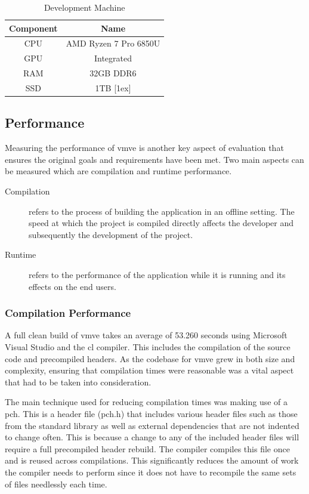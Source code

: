 \documentclass[11pt]{article}
\begin{document}
\begin{table}[H]
\centering
\begin{tabular}{|| c c ||} 
  \hline
  Component & Name \\ [0.5ex] 
  \hline\hline
  CPU & AMD Ryzen 7 Pro 6850U  \\ 
  GPU & Integrated \\
  RAM & 32GB DDR6 \\ 
  SSD & 1TB [1ex] \\
  \hline
\end{tabular}
\caption{Development Machine}
\label{fig:development_machine}
\end{table}


\subsection{Performance}
Measuring the performance of \gls*{vmve} is another key aspect of evaluation that
ensures the original goals and requirements have been met. Two main aspects can
be measured which are compilation and runtime performance.

\begin{description}
  \item[Compilation] refers to the process of building the application in an offline
  setting. The speed at which the project is compiled directly affects the
  developer and subsequently the development of the project.
  \item[Runtime] refers to the performance of the application while it is running and
  its effects on the end users.
\end{description}

\subsubsection{Compilation Performance}
A full clean build of \gls*{vmve} takes an average of 53.260 seconds using
Microsoft Visual Studio and the \gls*{cl} compiler. This includes the compilation
of the source code and precompiled headers. As the codebase for \gls*{vmve} grew
in both size and complexity, ensuring that compilation times were reasonable was
a vital aspect that had to be taken into consideration.

The main technique used for reducing compilation times was making use of a
\gls*{pch}. This is a header file (pch.h) that includes various header files such
as those from the standard library as well as external dependencies that are not
indented to change often. This is because a change to any of the included header
files will require a full precompiled header rebuild. The compiler compiles this
file once and is reused across compilations. This significantly reduces the
amount of work the compiler needs to perform since it does not have to recompile
the same sets of files needlessly each time.
\end{document}
